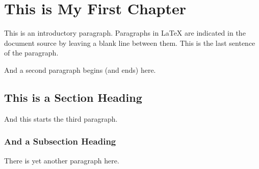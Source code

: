 \chapter{This is My First Chapter}

This is an introductory paragraph.  Paragraphs in \LaTeX{} are
indicated in the document source by leaving a blank line between
them.  This is the last sentence of the paragraph.

And a second paragraph begins (and ends) here.

\section{This is a Section Heading}

And this starts the third paragraph.

\subsection{And a Subsection Heading}

There is yet another paragraph here.
